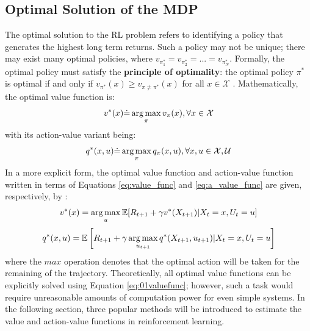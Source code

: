 \subsection{Optimal Solution of the MDP}
The optimal solution to the RL problem refers to identifying a policy that generates the highest long term returns. Such a policy may not be unique; there may exist many optimal policies, where $v_{\pi^*_1} = v_{\pi^*_2} = ... = v_{\pi^*_N}$.  Formally, the optimal policy must satisfy the \textbf{principle of optimality}: the optimal policy $\pi^*$ is optimal if and only if $v_{\pi^*}(x) \geq v_{\pi \neq \pi^*}(x)$ for all $x \in \mathcal{X}$ \cite{PO}. Mathematically, the optimal value function is:
\begin{equation}
    v^*(x) \dot{=} \operatorname*{arg\,max}_{\pi} v_{\pi}(x), \forall x \in \mathcal{X}
\end{equation}
with its action-value variant being:
\begin{equation}
    q^*(x, u) \dot{=} \operatorname*{arg\,max}_{\pi} q_{\pi}(x, u), \forall x, u \in \mathcal{X, U}
\end{equation}
In a more explicit form, the optimal value function and action-value function written in terms of Equations \ref{eq:value_func} and \ref{eq:a_value_func} are given, respectively, by \cite{sutton}:
\begin{equation}
    v^*(x) = \operatorname*{arg\,max}_{u} \mathbb{E}[R_{t+1} + \gamma v^*(X_{t+1}) | X_t = x, U_t = u]
    \label{eq:01valuefunc}
\end{equation}
\begin{equation}
    q^*(x, u) = \mathbb{E}\left[R_{t+1} + \gamma \operatorname*{arg\,max}_{u_{t+1}} q^*(X_{t+1}, u_{t+1}) | X_t = x, U_t = u \right]
\end{equation}
where the $max$ operation denotes that the optimal action will be taken for the remaining of the trajectory. Theoretically, all optimal value functions can be explicitly solved using Equation \ref{eq:01valuefunc}; however, such a task would require unreasonable amounts of computation power for even simple systems. In the following section, three popular methods will be introduced to estimate the value and action-value functions in reinforcement learning.
